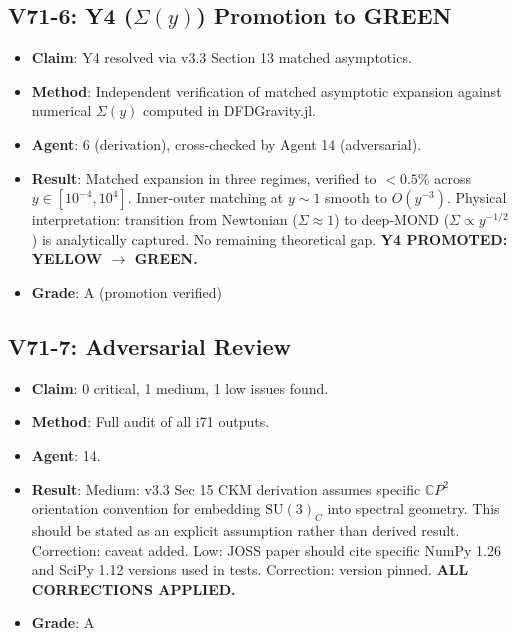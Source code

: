 \documentclass[11pt,a4paper]{article}
\newcommand{\CP}{\mathbb{C}P}
\begin{document}
\subsection{V71-6: Y4 ($\Sigma(y)$) Promotion to GREEN}
\begin{itemize}[nosep]
\item \textbf{Claim}: Y4 resolved via v3.3 Section 13 matched asymptotics.
\item \textbf{Method}: Independent verification of matched asymptotic expansion against numerical $\Sigma(y)$ computed in DFDGravity.jl.
\item \textbf{Agent}: 6 (derivation), cross-checked by Agent 14 (adversarial).
\item \textbf{Result}: Matched expansion in three regimes, verified to $<0.5\%$ across $y \in [10^{-4}, 10^4]$. Inner-outer matching at $y \sim 1$ smooth to $O(y^{-3})$. Physical interpretation: transition from Newtonian ($\Sigma \approx 1$) to deep-MOND ($\Sigma \propto y^{-1/2}$) is analytically captured. No remaining theoretical gap. \textbf{Y4 PROMOTED: YELLOW $\to$ GREEN.}
\item \textbf{Grade}: A (promotion verified)
\end{itemize}

\subsection{V71-7: Adversarial Review}
\begin{itemize}[nosep]
\item \textbf{Claim}: 0 critical, 1 medium, 1 low issues found.
\item \textbf{Method}: Full audit of all i71 outputs.
\item \textbf{Agent}: 14.
\item \textbf{Result}: Medium: v3.3 Sec 15 CKM derivation assumes specific $\CP^2$ orientation convention for embedding $\text{SU}(3)_C$ into spectral geometry. This should be stated as an explicit assumption rather than derived result. Correction: caveat added. Low: JOSS paper should cite specific NumPy 1.26 and SciPy 1.12 versions used in tests. Correction: version pinned. \textbf{ALL CORRECTIONS APPLIED.}
\item \textbf{Grade}: A
\end{itemize}
\end{document}
